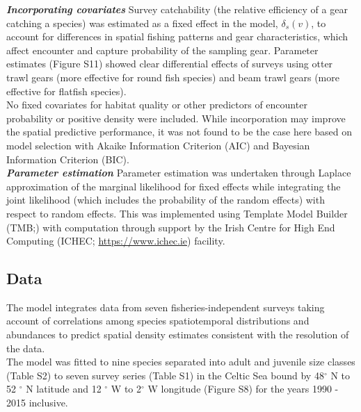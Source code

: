 \documentclass[fleqn,10pt]{wlscirep}
\begin{document}
\begin{linenumbers}
\textbf{\textit{Incorporating covariates}} Survey catchability (the relative
efficiency of a gear catching a species) was estimated as a fixed effect in the
model, $\delta_{s}(v)$, to account for differences in spatial fishing patterns
and gear characteristics, which affect encounter and capture probability of the
sampling gear\cite{Thorson2014}. Parameter estimates (Figure S11) showed clear
differential effects of surveys using otter trawl gears (more effective for
round fish species) and beam trawl gears (more effective for flatfish
species).\\

No fixed covariates for habitat quality or other predictors of encounter
probability or positive density were included. While incorporation may improve
the spatial predictive performance\cite{Thorson2017}, it was not found to be
the case here based on model selection with Akaike Information Criterion (AIC)
and Bayesian Information Criterion (BIC).\\

\textbf{\textit{Parameter estimation}} Parameter estimation was undertaken
through Laplace approximation of the marginal likelihood for fixed effects
while integrating the joint likelihood (which includes the probability of the
random effects) with respect to random effects. This was implemented using
Template Model Builder (TMB;\cite{Kristensen2015}) with computation through
support by the Irish Centre for High End Computing (ICHEC;
\url{https://www.ichec.ie}) facility.  \\

\subsection*{Data\\}

The model integrates data from seven fisheries-independent surveys taking
account of correlations among species spatiotemporal distributions and
abundances to predict spatial density estimates consistent with the resolution
of the data. \\

The model was fitted to nine species separated into adult and juvenile size
classes (Table S2) to seven survey series (Table S1) in the Celtic Sea bound by
48$^{\circ}$ N to 52 $^{\circ}$ N latitude and 12 $^{\circ}$ W to 2$^{\circ}$ W
longitude (Figure S8) for the years 1990 - 2015 inclusive. \\


\end{linenumbers}
\end{document}
